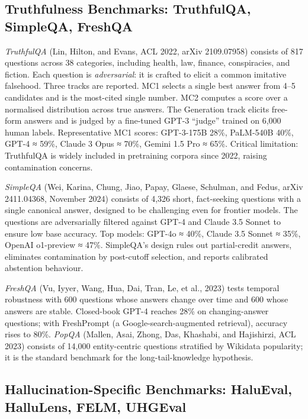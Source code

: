 \documentclass{article}
\begin{document}
\subsection{Truthfulness Benchmarks: TruthfulQA, SimpleQA, FreshQA}\label{truthfulness-benchmarks-truthfulqa-simpleqa-freshqa}

\emph{TruthfulQA} (Lin, Hilton, and Evans, ACL 2022, arXiv 2109.07958) consists of 817 questions across 38 categories, including health, law, finance, conspiracies, and fiction. Each question is \emph{adversarial}: it is crafted to elicit a common imitative falsehood. Three tracks are reported. MC1 selects a single best answer from 4--5 candidates and is the most-cited single number. MC2 computes a score over a normalised distribution across true answers. The Generation track elicits free-form answers and is judged by a fine-tuned GPT-3 ``judge'' trained on 6,000 human labels. Representative MC1 scores: GPT-3-175B 28\%, PaLM-540B 40\%, GPT-4 ≈ 59\%, Claude 3 Opus ≈ 70\%, Gemini 1.5 Pro ≈ 65\%. Critical limitation: TruthfulQA is widely included in pretraining corpora since 2022, raising contamination concerns.

\emph{SimpleQA} (Wei, Karina, Chung, Jiao, Papay, Glaese, Schulman, and Fedus, arXiv 2411.04368, November 2024) consists of 4,326 short, fact-seeking questions with a single canonical answer, designed to be challenging even for frontier models. The questions are adversarially filtered against GPT-4 and Claude 3.5 Sonnet to ensure low base accuracy. Top models: GPT-4o ≈ 40\%, Claude 3.5 Sonnet ≈ 35\%, OpenAI o1-preview ≈ 47\%. SimpleQA's design rules out partial-credit answers, eliminates contamination by post-cutoff selection, and reports calibrated abstention behaviour.

\emph{FreshQA} (Vu, Iyyer, Wang, Hua, Dai, Tran, Le, et al., 2023) tests temporal robustness with 600 questions whose answers change over time and 600 whose answers are stable. Closed-book GPT-4 reaches 28\% on changing-answer questions; with FreshPrompt (a Google-search-augmented retrieval), accuracy rises to 80\%. \emph{PopQA} (Mallen, Asai, Zhong, Das, Khashabi, and Hajishirzi, ACL 2023) consists of 14,000 entity-centric questions stratified by Wikidata popularity; it is the standard benchmark for the long-tail-knowledge hypothesis.

\subsection{Hallucination-Specific Benchmarks: HaluEval, HalluLens, FELM, UHGEval}\label{hallucination-specific-benchmarks-halueval-hallulens-felm-uhgeval}
\end{document}
